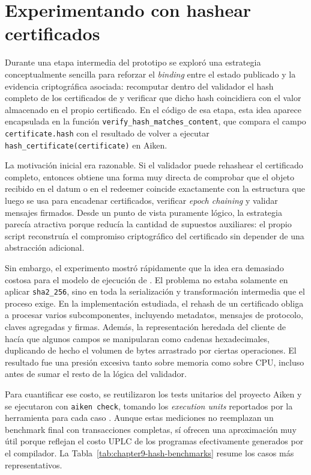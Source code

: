 
\section{Experimentando con hashear certificados}

Durante una etapa intermedia del prototipo se exploró una estrategia conceptualmente sencilla para reforzar el \textit{binding} entre el estado publicado \Onchain y la evidencia criptográfica asociada: recomputar dentro del validador el hash completo de los certificados de \Mithril y verificar que dicho hash coincidiera con el valor almacenado en el propio certificado. En el código de esa etapa, esta idea aparece encapsulada en la función \texttt{verify\_hash\_matches\_content}, que compara el campo \texttt{certificate.hash} con el resultado de volver a ejecutar \texttt{hash\_certificate(certificate)} en Aiken.

La motivación inicial era razonable. Si el validador puede rehashear el certificado completo, entonces obtiene una forma muy directa de comprobar que el objeto recibido en el datum o en el redeemer coincide exactamente con la estructura que luego se usa para encadenar certificados, verificar \textit{epoch chaining} y validar mensajes firmados. Desde un punto de vista puramente lógico, la estrategia parecía atractiva porque reducía la cantidad de supuestos auxiliares: el propio script reconstruía el compromiso criptográfico del certificado sin depender de una abstracción adicional.

Sin embargo, el experimento mostró rápidamente que la idea era demasiado costosa para el modelo de ejecución de \Cardano. El problema no estaba solamente en aplicar \texttt{sha2\_256}, sino en toda la serialización y transformación intermedia que el proceso exige. En la implementación estudiada, el rehash de un certificado obliga a procesar varios subcomponentes, incluyendo metadatos, mensajes de protocolo, claves agregadas y firmas. Además, la representación heredada del cliente de \Mithril hacía que algunos campos se manipularan como cadenas hexadecimales, duplicando de hecho el volumen de bytes arrastrado por ciertas operaciones. El resultado fue una presión excesiva tanto sobre memoria como sobre CPU, incluso antes de sumar el resto de la lógica del validador.

Para cuantificar ese costo, se reutilizaron los tests unitarios del proyecto Aiken y se ejecutaron con \texttt{aiken check}, tomando los \textit{execution units} reportados por la herramienta para cada caso \cite{aiken2026}. Aunque estas mediciones no reemplazan un benchmark final \Onchain con transacciones completas, sí ofrecen una aproximación muy útil porque reflejan el costo UPLC de los programas efectivamente generados por el compilador. La Tabla~\ref{tab:chapter9-hash-benchmarks} resume los casos más representativos.

